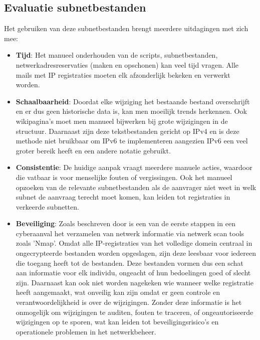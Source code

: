 
\subsection{Evaluatie subnetbestanden}
\label{uitdagingen}
Het gebruiken van deze subnetbestanden brengt meerdere uitdagingen met zich mee:
\begin{itemize}
    \item \textbf{Tijd}: Het manueel onderhouden van de scripts, subnetbestanden, netwerkadresreservaties (maken en opschonen) kan veel tijd vragen. Alle mails met IP registraties moeten elk afzonderlijk bekeken en verwerkt worden.
    \item \textbf{Schaalbaarheid}: Doordat elke wijziging het bestaande bestand overschrijft en er dus geen historische data is, kan men moeilijk trends herkennen. Ook wikipagina's moet men manueel bijwerken bij grote wijzigingen in de structuur. Daarnaast zijn deze tekstbestanden gericht op IPv4 en is deze methode niet bruikbaar om IPv6 te implementeren aangezien IPv6 een veel groter bereik heeft en een andere notatie gebruikt.
    \item \textbf{Consistentie}: De huidige aanpak vraagt meerdere manuele acties, waardoor die vatbaar is voor menselijke fouten of vergissingen. Ook het manueel opzoeken van de relevante subnetbestanden als de aanvrager niet weet in welk subnet de aanvraag terecht moet komen, kan leiden tot registraties in verkeerde subnetten.  
    \item \textbf{Beveiliging}: Zoals beschreven door \textcite{Liao2020} is een van de eerste stappen in een cyberaanval het verzamelen van netwerk informatie via netwerk scan tools zoals 'Nmap'. Omdat alle IP-registraties van het volledige domein centraal in ongecrypteerde bestanden worden opgeslagen, zijn deze leesbaar voor iedereen die toegang heeft tot de bestanden. Deze bestanden vormen dus een schat aan informatie voor elk individu, ongeacht of hun bedoelingen goed of slecht zijn. Daarnaast kan ook niet worden nagekeken wie wanneer welke registratie heeft aangemaakt, wat onveilig kan zijn omdat er geen controle en verantwoordelijkheid is over de wijzigingen. Zonder deze informatie is het onmogelijk om wijzigingen te auditen, fouten te traceren, of ongeautoriseerde wijzigingen op te sporen, wat kan leiden tot beveiligingsrisico's en operationele problemen in het netwerkbeheer.
\end{itemize}

